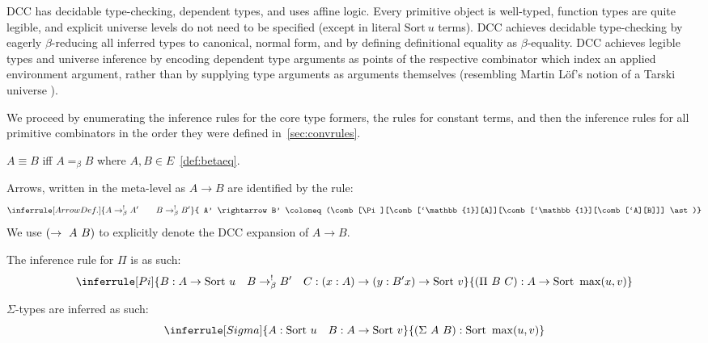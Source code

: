 \documentclass{lmcs}
\newcommand{\arr}{\rightarrow}
\newcommand{\sort}[1]{\text{Sort}\ #1}
\newcommand{\barr}{\arr_{\beta}}
\begin{document}
DCC has decidable type-checking, dependent types, and uses affine logic. Every primitive object is well-typed, function types are quite legible, and explicit universe levels do not need to be specified (except in literal \(\sort{u}\) terms). DCC achieves decidable type-checking by eagerly \(\beta\)-reducing all inferred types to canonical, normal form, and by defining definitional equality as \(\beta\)-equality. DCC achieves legible types and universe inference by encoding dependent type arguments as points of the respective combinator which index an applied environment argument, rather than by supplying type arguments as arguments themselves (resembling Martin L\"of's notion of a Tarski universe \autocite[p. 88]{martin1984intuitionistic}).

We proceed by enumerating the inference rules for the core type formers, the rules for constant terms, and then the inference rules for all primitive combinators in the order they were defined in~\ref{sec:convrules}.

\begin{defi}\label{def:defeq}
  \(A \equiv B\) iff \(A =_\beta B\) where \(A, B \in E\)~\ref{def:betaeq}.
\end{defi}

\begin{defi}\label{def:arrowsimple}
  Arrows, written in the meta-level as \(A \rightarrow B\) are identified by the rule:
  \[
    \inferrule[Arrow Def.]
    { A \barr^{!} A' \qquad B \barr^{!} B'}
    { A' \rightarrow B' \coloneq (\comb[\Pi][\comb[`\mathbb{1}][A]][\comb[`\mathbb{1}][\comb[`A][B]]] \ast)}
  \]
  We use \(\comb[\rightarrow][A][B]\) to explicitly denote the DCC expansion of \(A \rightarrow B\).
\end{defi}

\begin{defi}\label{def:inferpi}
  The inference rule for \(\Pi\) is as such:
  \[
    \begin{gathered}
    \inferrule[Pi]
    { B : A \rightarrow \sort{u} \quad B \barr^{!} B' \quad C : (x : A) \rightarrow (y : B' x) \rightarrow \sort{v}}
    { \comb[\Pi][B][C] : A \rightarrow \sort{\max(u, v)}}
    \end{gathered}
  \]
\end{defi}

\begin{defi}
  \(\Sigma\)-types are inferred as such:
  \[
    \inferrule[Sigma]
    { A : \sort{u} \quad B : A \rightarrow \sort{v}}
    { \comb[\Sigma][A][B] : \sort{\max(u, v)}}
  \]
\end{defi}
\end{document}
